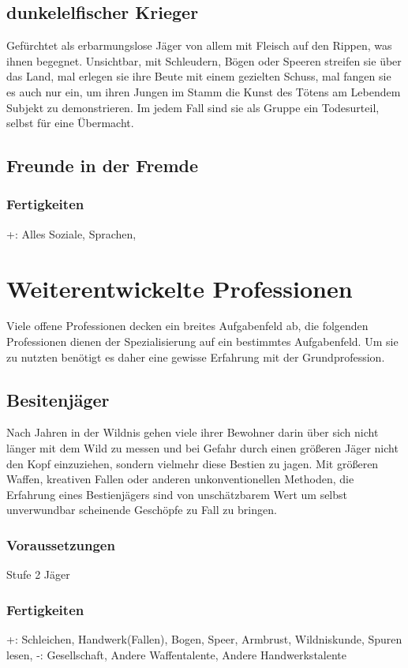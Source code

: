 \documentclass[a4paper,12pt,oneside]{book}
\begin{document}
\section{dunkelelfischer Krieger}
Gefürchtet als erbarmungslose Jäger von allem mit Fleisch auf den Rippen, was ihnen begegnet. Unsichtbar, mit Schleudern, Bögen oder Speeren streifen sie über das Land, mal erlegen sie ihre Beute mit einem gezielten Schuss, mal fangen sie es auch nur ein, um ihren Jungen im Stamm die Kunst des Tötens am Lebendem Subjekt zu demonstrieren. Im jedem Fall sind sie als Gruppe ein Todesurteil, selbst für eine Übermacht.

\section{Freunde in der Fremde}
\subsection{Fertigkeiten}
+: Alles Soziale, Sprachen, 



\chapter{Weiterentwickelte Professionen}
Viele offene Professionen decken ein breites Aufgabenfeld ab, die folgenden Professionen dienen der Spezialisierung auf ein bestimmtes Aufgabenfeld. Um sie zu nutzten benötigt es daher eine gewisse Erfahrung mit der Grundprofession.

\section{Besitenjäger}
Nach Jahren in der Wildnis gehen viele ihrer Bewohner darin über sich nicht länger mit dem Wild zu messen und bei Gefahr durch einen größeren Jäger nicht den Kopf einzuziehen, sondern vielmehr diese Bestien zu jagen. Mit größeren Waffen, kreativen Fallen oder anderen unkonventionellen Methoden, die Erfahrung eines Bestienjägers sind von unschätzbarem Wert um selbst unverwundbar scheinende Geschöpfe zu Fall zu bringen.
\subsection{Voraussetzungen}
Stufe 2 Jäger
\subsection{Fertigkeiten}
+: Schleichen, Handwerk(Fallen), Bogen, Speer, Armbrust, Wildniskunde, Spuren lesen, 
-: Gesellschaft, Andere Waffentalente, Andere Handwerkstalente
\end{document}
